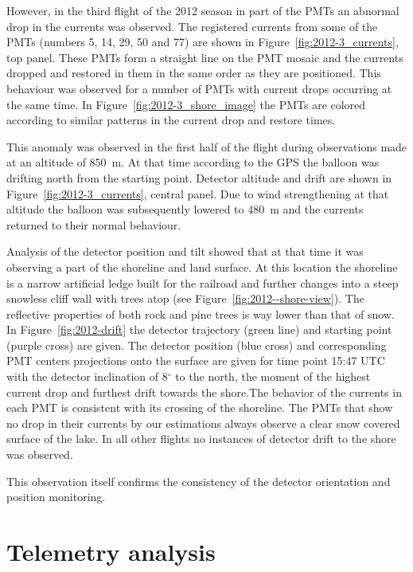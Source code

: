 \documentclass[universe,article,submit,moreauthors,pdftex]{Definitions/mdpi}
\begin{document}
\begin{paracol}{2}
However, in the third flight of the 2012 season in part of the PMTs an abnormal drop in the currents was observed.
The registered currents from some of the PMTs (numbers 5, 14, 29, 50 and 77) are shown in Figure~\ref{fig:2012-3_currents}, top panel. These PMTs form a straight line on the PMT mosaic and the currents dropped and restored in them in the same order as they are positioned. This behaviour was observed for a number of PMTs with current drops occurring at the same time. In Figure~\ref{fig:2012-3_shore_image} the PMTs are colored according to similar patterns in the current drop and restore times.

This anomaly was observed in the first half of the flight during observations made at an altitude of 850~m. At that time according to the GPS the balloon was drifting north from the starting point. Detector altitude and drift are shown in Figure~\ref{fig:2012-3_currents}, central panel. Due to wind strengthening at that altitude the balloon was subsequently lowered to 480~m and the currents returned to their normal behaviour. 

Analysis of the detector position and tilt showed that at that time it was observing a part of the shoreline and land surface. At this location the shoreline is a narrow artificial ledge built for the railroad and further changes into a steep snowless cliff wall with trees atop (see Figure~\ref{fig:2012--shore-view}). The reflective properties of both rock and pine trees is way lower than that of snow. In Figure~\ref{fig:2012-drift} the detector trajectory (green line) and starting point (purple cross) are given. The detector position (blue cross) and corresponding PMT centers projections onto the surface are given for time point 15:47 UTC with the detector inclination of 8$^\circ$ to the north, the moment of the highest current drop and furthest drift towards the shore.The behavior of the currents in each PMT is consistent with its crossing of the shoreline. The PMTs that show no drop in their currents by our estimations always observe a clear snow covered surface of the lake. In all other flights no instances of detector drift to the shore was observed. 

This observation itself confirms the consistency of the detector orientation and position monitoring.

\section{Telemetry analysis}


\end{paracol}
\end{document}
